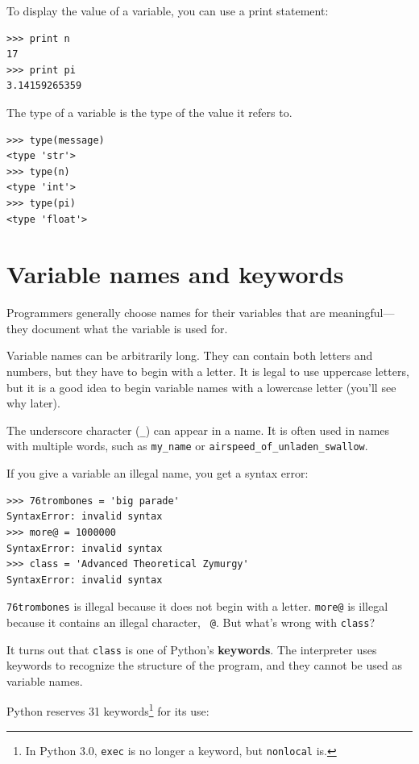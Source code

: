 \documentclass[10pt]{book}
\begin{document}
To display the value of a variable, you can use a print statement:

\beforeverb
\begin{verbatim}
>>> print n
17
>>> print pi
3.14159265359
\end{verbatim}
\afterverb
%
The type of a variable is the type of the value it refers to.

\beforeverb
\begin{verbatim}
>>> type(message)
<type 'str'>
>>> type(n)
<type 'int'>
>>> type(pi)
<type 'float'>
\end{verbatim}
\afterverb
%

\section{Variable names and keywords}

Programmers generally choose names for their variables that
are meaningful---they document what the variable is used for.

Variable names can be arbitrarily long.  They can contain
both letters and numbers, but they have to begin with a letter.
It is legal to use uppercase letters, but it is a good idea
to begin variable names with a lowercase letter (you'll
see why later).

The underscore character (\verb"_") can appear in a name.
It is often used in names with multiple words, such as
\verb"my_name" or \verb"airspeed_of_unladen_swallow".


If you give a variable an illegal name, you get a syntax error:

\beforeverb
\begin{verbatim}
>>> 76trombones = 'big parade'
SyntaxError: invalid syntax
>>> more@ = 1000000
SyntaxError: invalid syntax
>>> class = 'Advanced Theoretical Zymurgy'
SyntaxError: invalid syntax
\end{verbatim}
\afterverb
%
{\tt 76trombones} is illegal because it does not begin with a letter.
{\tt more@} is illegal because it contains an illegal character, {\tt
@}.  But what's wrong with {\tt class}?

It turns out that {\tt class} is one of Python's {\bf keywords}.  The
interpreter uses keywords to recognize the structure of the program,
and they cannot be used as variable names.


Python reserves 31 keywords\footnote{In Python 3.0, {\tt exec} is no
longer a keyword, but {\tt nonlocal} is.} for its use:
\end{document}
